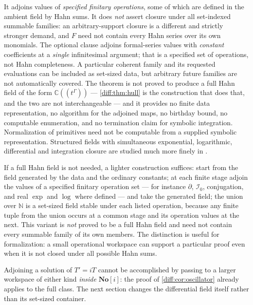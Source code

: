 \documentclass[11pt,letterpaper]{article}
\numberwithin{equation}{section}
\theoremstyle{definition}
\theoremstyle{remark}
\newcommand{\SC}{\mathbf{No}[i]}
\newcommand{\C}{\mathbb C}
\newcommand{\N}{\mathbb N}
\newcommand{\der}{\partial}
\newcommand{\Izero}{\mathcal I_{0}}
\begin{document}
\begin{warning}
\label{diff:warn:localizelimits}
It adjoins values of \emph{specified finitary operations}, some of which are
defined in the ambient field by Hahn sums. It does \emph{not} assert closure
under all set-indexed summable families: an arbitrary-support closure is a
different and strictly stronger demand, and $F$ need not contain every Hahn
series over its own monomials. The optional clause adjoins formal-series
values with \emph{constant} coefficients at a \emph{single} infinitesimal
argument; that is a specified set of operations, not Hahn completeness. A
particular coherent family and its requested evaluations can be included as
set-sized data, but arbitrary future families are not automatically covered.
The theorem is not proved to produce a full Hahn field of the form
$\C((t^{\Gamma}))$ --- \cref{diff:thm:hull} is the construction that does that,
and the two are not interchangeable --- and it provides no finite data
representation, no algorithm for the adjoined maps, no birthday bound, no
computable enumeration, and no termination claim for symbolic integration.
Normalization of primitives need not be computable from a supplied symbolic
representation. Structured fields with simultaneous exponential, logarithmic,
differential and integration closure are studied much more finely in
\cite{BG}.
\end{warning}

\begin{remark}
\label{diff:rem:finitaryclosure}
If a full Hahn field is not needed, a lighter construction suffices: start
from the field generated by the data and the ordinary constants; at each finite
stage adjoin the values of a specified finitary operation set --- for instance
$\der$, $\Izero$, conjugation, and real $\exp$ and $\log$ where defined --- and
take the generated field; the union over $\N$ is a set-sized field stable
under each listed operation, because any finite tuple from the union occurs at
a common stage and its operation values at the next. This variant is
\emph{not} proved to be a full Hahn field and need not contain every summable
family of its own members. The distinction is useful for formalization: a small
operational workspace can support a particular proof even when it is not closed
under all possible Hahn sums.
\end{remark}

\begin{remark}
\label{diff:rem:nolocaloscillator}
Adjoining a solution of $T'=iT$ cannot be accomplished by passing to a larger
workspace of either kind \emph{inside} $\SC$: the proof of
\cref{diff:cor:oscillator} already applies to the full class. The next section
changes the differential field itself rather than its set-sized container.
\end{remark}
\end{document}
